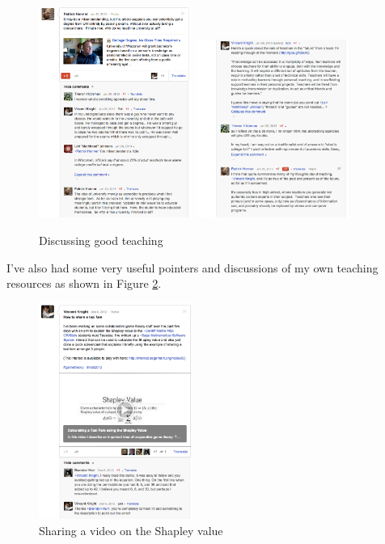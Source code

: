 \documentclass[a4paper,12pt]{article}
\begin{document}
\begin{figure}[htdp]
    \begin{center}
        \includegraphics[width=5cm]{images/chat_about_teachers-a.png}
        \includegraphics[width=5cm]{images/chat_about_teachers-b.png}
    \end{center}
    \caption{Discussing good teaching}
    \label{chat_about_teaching_resources}
\end{figure}

I've also had some very useful pointers and discussions of my own teaching resources as shown in Figure \ref{chat_about_Shapley_value_video}.\\

\begin{figure}[htdp]
    \begin{center}
        \includegraphics[width=5cm]{images/chat_about_Shapley_value_video.png}
    \end{center}
    \caption{Sharing a video on the Shapley value}
    \label{chat_about_Shapley_value_video}
\end{figure}
\end{document}
